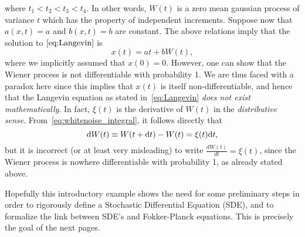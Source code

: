 where $t_1 < t_2 < t_3 < t_4$. In other words, $W(t)$ is a zero mean gaussian process of variance $t$ which has the property of independent increments. Suppose now that $a(x,t) = a$ and $b(x,t) = b$ are constant. The above relations imply that the solution to $\eqref{eq:Langevin}$ is
\begin{equation}
	x(t) = at + bW(t),
\end{equation}
where we implicitly assumed that $x(0) = 0$. However, one can show that the Wiener process is not differentiable with probability 1. We are thus faced with a paradox here since this implies that $x(t)$ is itself non-differentiable, and hence that the Langevin equation as stated in~\eqref{eq:Langevin} \textit{does not exist mathematically}. In fact, $\xi(t)$ is the derivative of $W(t)$ in the \textit{distributive sense}. From~\eqref{eq:whitenoise_integral}, it follows directly that
\begin{equation}\label{eq:dW}
	\rm dW(t) \equiv W(t+\rm dt) - W(t) = \xi(t) \rm dt,
\end{equation}
but it is incorrect (or at least very misleading) to write $\frac{dW(t)}{dt} = \xi(t)$, since the Wiener process is nowhere differentiable with probability 1, as already stated above.

Hopefully this introductory example shows the need for some preliminary steps in order to rigorously define a Stochastic Differential Equation (SDE), and to formalize the link between SDE's and Fokker-Planck equations. This is precisely the goal of the next pages.

